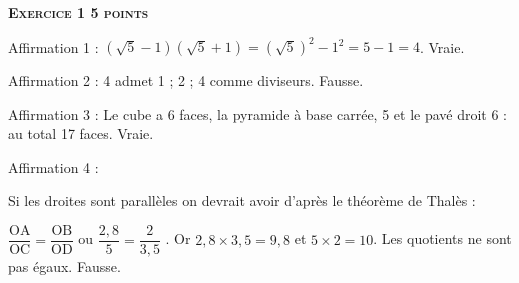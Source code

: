 \textbf{\textsc{Exercice 1 \hfill 5 points}}

\medskip

 
Affirmation 1 : $\left(\sqrt{5} - 1 \right)\left(\sqrt{5} + 1\right) = \left(\sqrt{5} \right)^2 - 1^2 = 5 - 1 = 4$. Vraie.%

\medskip

Affirmation 2 : %
4 admet 1 ; 2 ; 4 comme diviseurs. Fausse.
\medskip
 
Affirmation 3 : %
Le cube a 6 faces, la pyramide à base carrée, 5 et le pavé droit 6 : au total 17 faces. Vraie.
\medskip
 
Affirmation 4 : 

%
Si les droites sont parallèles on devrait avoir d'après le théorème de Thalès :

$\dfrac{\text{OA}}{\text{OC}} = \dfrac{\text{OB}}{\text{OD}}$ ou $\dfrac{2,8}{5} = \dfrac{2}{3,5}$ . Or $2,8 \times 3,5 = 9,8$ et $5 \times 2 = 10$. Les quotients ne sont pas égaux. Fausse.

\bigskip

